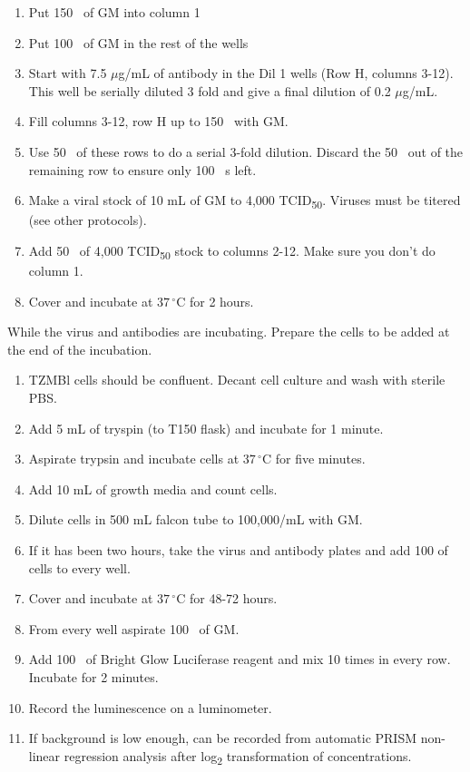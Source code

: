 \begin{enumerate}
  \item Put 150 \microliter~of GM into column 1
  \item Put 100 \microliter~of GM in the rest of the wells
  \item Start with 7.5 $\mu$g/mL of antibody in the Dil 1 wells (Row H, columns 3-12). This well be serially diluted 3 fold and give a final dilution of 0.2 $\mu$g/mL.
  \item Fill columns 3-12, row H up to 150 \microliter~with GM.
  \item Use 50 \microliter~of these rows to do a serial 3-fold dilution. Discard the 50 \microliter~out of the remaining row to ensure only 100 \microliter ~s left.
  \item Make a viral stock of 10 mL of GM to 4,000 TCID\textsubscript{50}. Viruses must be titered (see other protocols).
  \item Add 50 \microliter~of 4,000 TCID\textsubscript{50} stock to columns 2-12. Make sure you don't do column 1.
  \item Cover and incubate at $37\,^{\circ}\mathrm{C}$ for 2 hours.
\end{enumerate}

While the virus and antibodies are incubating. Prepare the cells to be added at the end of the incubation.

\begin{enumerate}
  \item TZMBl cells should be confluent. Decant cell culture and wash with sterile PBS.
  \item Add 5 mL of tryspin (to T150 flask) and incubate for 1 minute.
  \item Aspirate trypsin and incubate cells at $37\,^{\circ}\mathrm{C}$ for five minutes.
  \item Add 10 mL of growth media and count cells.
  \item Dilute cells in 500 mL falcon tube to 100,000/mL with GM.
  \item If it has been two hours, take the virus and antibody plates and add 100 \microliter of cells to every well.
  \item Cover and incubate at $37\,^{\circ}\mathrm{C}$ for 48-72 hours.
  \item From every well aspirate 100 \microliter~of GM.
  \item Add 100 \microliter~of Bright Glow Luciferase reagent and mix 10 times in every row. Incubate for 2 minutes.
  \item Record the luminescence on a luminometer.
  \item If background is low enough, \ic can be recorded from automatic PRISM non-linear regression analysis after log\textsubscript{2} transformation of concentrations.
\end{enumerate}



\clearpage